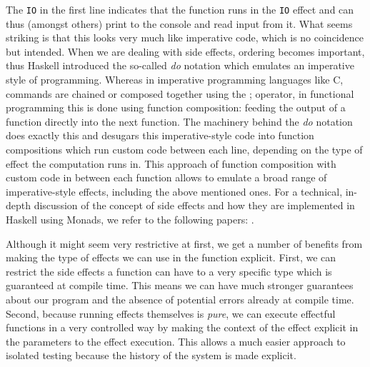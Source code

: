 The \texttt{IO} in the first line indicates that the function runs in the \texttt{IO} effect and can thus (amongst others) print to the console and read input from it. What seems striking is that this looks very much like imperative code, which is no coincidence but intended. When we are dealing with side effects, ordering becomes important, thus Haskell introduced the so-called \textit{do} notation which emulates an imperative style of programming. Whereas in imperative programming languages like C, commands are chained or composed together using the ; operator, in functional programming this is done using function composition: feeding the output of a function directly into the next function. The machinery behind the \textit{do} notation does exactly this and desugars this imperative-style code into function compositions which run custom code between each line, depending on the type of effect the computation runs in. This approach of function composition with custom code in between each function allows to emulate a broad range of imperative-style effects, including the above mentioned ones. For a technical, in-depth discussion of the concept of side effects and how they are implemented in Haskell using Monads, we refer to the following papers: \cite{jones_tackling_2002,moggi_computational_1989,wadler_essence_1992,wadler_monads_1995,wadler_how_1997}.

\medskip

Although it might seem very restrictive at first, we get a number of benefits from making the type of effects we can use in the function explicit. First, we can restrict the side effects a function can have to a very specific type which is guaranteed at compile time. This means we can have much stronger guarantees about our program and the absence of potential errors already at compile time. Second, because running effects themselves is \textit{pure}, we can execute effectful functions in a very controlled way by making the context of the effect explicit in the parameters to the effect execution. This allows a much easier approach to isolated testing because the history of the system is made explicit. 

